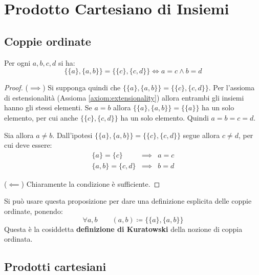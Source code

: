 \section{Prodotto Cartesiano di Insiemi}

\subsection{Coppie ordinate}


\begin{propbox}
	Per ogni $a,b,c,d$ si ha:
	\begin{displaymath}
		\{\{a\}, \{a,b\}\} = \{\{c\}, \{c,d\}\} \iff a = c \wedge b = d
	\end{displaymath}
\end{propbox}

\begin{proof}
	($\implies$) Si supponga quindi che $\{\{a\}, \{a,b\}\} = \{\{c\}, \{c,d\}\}$. Per l'assioma di estensionalità (Assioma \ref{axiom:extensionality}) allora entrambi gli insiemi hanno gli stessi elementi. Se $a=b$ allora $\{\{a\},\{a,b\}\}=\{\{a\}\}$ ha un solo elemento, per cui anche $\{\{c\},\{c,d\}\}$ ha un solo elemento. Quindi $a=b=c=d$.
	
	Sia allora $a \neq b$. Dall'ipotesi $\{\{a\}, \{a,b\}\} = \{\{c\}, \{c,d\}\}$ segue allora $c \neq d$, per cui deve essere:
	\begin{eqnarray*}
		\{a\}=\{c\} &\implies& a=c \\
		\{a,b\}=\{c,d\} &\implies& b=d
	\end{eqnarray*}
	
	($\impliedby$) Chiaramente la condizione è sufficiente.
\end{proof}

Si può usare questa proposizione per dare una definizione esplicita delle coppie ordinate, ponendo: $$\forall a,b \qquad (a,b) \coloneqq \{\{a\}, \{a,b\}\}$$  Questa è la cosiddetta \textbf{definizione di Kuratowski} della nozione di coppia ordinata.

\subsection{Prodotti cartesiani}

